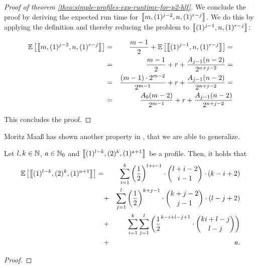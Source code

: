 \begin{proof}[Proof of theorem \ref{theo:simple-profiles-exp-runtime-for-p2-hlf}]
  We conclude the proof by deriving the expected run time for $\left\llbracket m,(1)^{j-2},n,(1)^{r-j} \right\rrbracket$. We do this by applying the definition and thereby reducing the problem to $\left\llbracket (1)^{j-1},n,(1)^{r-j} \right\rrbracket$:

  \begin{eqnarray*}
    \mathbb{E}\left[ \left\llbracket m,(1)^{j-2},n,(1)^{r-j} \right\rrbracket \right]
    & = & 
    \frac{m-1}{2} + \mathbb{E}\left[ \left\llbracket (1)^{j-1},n,(1)^{r-j} \right\rrbracket \right] = \\
    & = &
    \frac{m-1}{2} + r + \frac{A_{j-1}(n-2)}{2^{n+j-2}} = \\
    & = &
    \frac{(m-1)\cdot 2^{m-2}}{2^{m-1}} + r + \frac{A_{j-1}(n-2)}{2^{n+j-2}} = \\
    & = &
    \frac{A_0(m-2)}{2^{m-1}} + r + \frac{A_{j-1}(n-2)}{2^{n+j-2}}
  \end{eqnarray*}
  
  This concludes the proof.
\end{proof}

Moritz Maaß has shown another property in \cite{MoritzMaasDiploma}, that we are able to generalize.

\begin{theorem}
  Let $l, k\in\mathbb{N}$, $a\in\mathbb{N}_0$ and $\left\llbracket (1)^{l-k}, (2)^{k}, (1)^{a+1} \right\rrbracket$ be a profile. Then, it holds that
  \begin{eqnarray*}
    \mathbb{E}\left[ \left\llbracket (1)^{l-k}, (2)^{k}, (1)^{a+1} \right\rrbracket \right]
    = & &
    \sum_{i=1}^k \left(\frac{1}{2}\right)^{l+i-1} \cdot \binom{l+i-2}{i-1} \cdot \left( k-i+2 \right) \\
    & + & \sum_{j=1}^l \left(\frac{1}{2}\right)^{k+j-1} \cdot \binom{k+j-2}{j-1} \cdot \left( l-j+2 \right) \\
    & + & \sum_{i=1}^k \sum_{j=1}^l \left( \frac{1}{2}^{k-i+l-j+1}\cdot\binom{ki+l-j}{l-j} \right) \\
    & + & a
    .
  \end{eqnarray*}
\end{theorem}

\begin{proof}
\end{proof}

